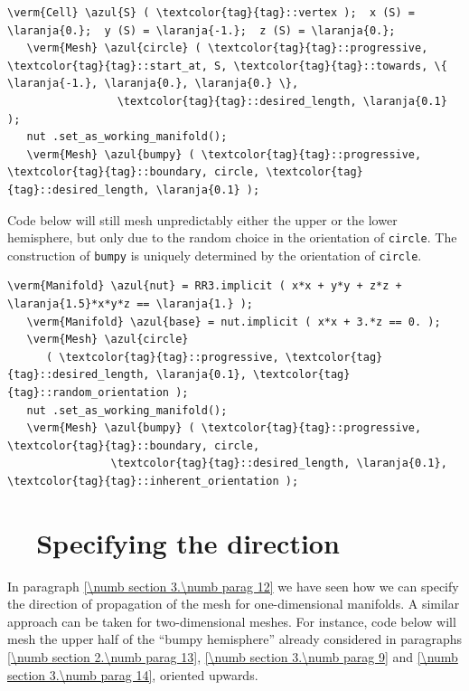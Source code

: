 \begin{Verbatim}[commandchars=\\\{\},formatcom=\small\tt,
   baselinestretch=0.94,framesep=2mm                     ]
   \verm{Cell} \azul{S} ( \textcolor{tag}{tag}::vertex );  x (S) = \laranja{0.};  y (S) = \laranja{-1.};  z (S) = \laranja{0.};
   \verm{Mesh} \azul{circle} ( \textcolor{tag}{tag}::progressive, \textcolor{tag}{tag}::start_at, S, \textcolor{tag}{tag}::towards, \{ \laranja{-1.}, \laranja{0.}, \laranja{0.} \},
                 \textcolor{tag}{tag}::desired_length, \laranja{0.1}                                          );
   nut .set_as_working_manifold();
   \verm{Mesh} \azul{bumpy} ( \textcolor{tag}{tag}::progressive, \textcolor{tag}{tag}::boundary, circle, \textcolor{tag}{tag}::desired_length, \laranja{0.1} );
\end{Verbatim}

Code below will still mesh unpredictably either the upper or the lower
hemisphere, but only due to the random choice in the orientation of {\small\tt circle}.
The construction of {\small\tt bumpy} is uniquely determined by the orientation of
{\small\tt circle}.

\begin{Verbatim}[commandchars=\\\{\},formatcom=\small\tt,
   baselinestretch=0.94,framesep=2mm                      ]
   \verm{Manifold} \azul{nut} = RR3.implicit ( x*x + y*y + z*z + \laranja{1.5}*x*y*z == \laranja{1.} );
   \verm{Manifold} \azul{base} = nut.implicit ( x*x + 3.*z == 0. );
   \verm{Mesh} \azul{circle}
      ( \textcolor{tag}{tag}::progressive, \textcolor{tag}{tag}::desired_length, \laranja{0.1}, \textcolor{tag}{tag}::random_orientation );
   nut .set_as_working_manifold();
   \verm{Mesh} \azul{bumpy} ( \textcolor{tag}{tag}::progressive, \textcolor{tag}{tag}::boundary, circle,
                \textcolor{tag}{tag}::desired_length, \laranja{0.1}, \textcolor{tag}{tag}::inherent_orientation );
\end{Verbatim}


\section{~~Specifying the direction}\label{\numb section 3.\numb parag 15}

In paragraph \ref{\numb section 3.\numb parag 12} we have seen how we can specify the direction
of propagation of the mesh for one-dimensional manifolds.
A similar approach can be taken for two-dimensional meshes.
For instance, code below will mesh the upper half of the ``bumpy hemisphere'' already considered
in paragraphs \ref{\numb section 2.\numb parag 13}, \ref{\numb section 3.\numb parag 9} and
\ref{\numb section 3.\numb parag 14}, oriented upwards.

